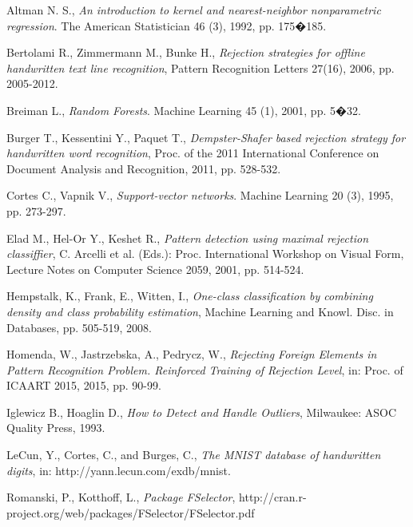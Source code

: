 \documentclass{llncs}
\begin{document}
\begin{thebibliography}{1}

Altman N. S., \emph{An introduction to kernel and nearest-neighbor nonparametric regression}. The American Statistician 46 (3), 1992, pp. 175�185.

Bertolami R., Zimmermann M., Bunke H., \emph{Rejection strategies for offline handwritten text line recognition}, Pattern Recognition Letters 27(16), 2006, pp. 2005-2012.

Breiman L., \emph{Random Forests}. Machine Learning 45 (1), 2001, pp. 5�32. 

Burger T., Kessentini Y., Paquet T., \emph{Dempster-Shafer based rejection strategy for handwritten word recognition}, Proc. of the 2011 International Conference on Document Analysis and Recognition, 2011, pp. 528-532.

Cortes C., Vapnik V., \emph{Support-vector networks}. Machine Learning 20 (3), 1995, pp. 273-297.
 
Elad M., Hel-Or Y., Keshet R., \emph{Pattern detection using maximal rejection classiffier}, C. Arcelli et al. (Eds.): Proc. International Workshop on Visual Form, Lecture Notes on Computer Science 2059, 2001, pp. 514-524.
 
Hempstalk, K., Frank, E., Witten, I., \emph{One-class classification by combining density and class probability estimation}, Machine Learning and Knowl. Disc. in Databases, pp. 505-519, 2008.

Homenda, W., Jastrzebska, A., Pedrycz, W., \emph{Rejecting Foreign Elements in Pattern Recognition Problem. Reinforced Training of Rejection Level}, in: Proc. of ICAART 2015, 2015, pp. 90-99.

Iglewicz B., Hoaglin D., \emph{How to Detect and Handle Outliers},  Milwaukee: ASOC Quality Press, 1993.

LeCun, Y., Cortes, C., and Burges, C., \emph{The MNIST database of handwritten digits}, in: http://yann.lecun.com/exdb/mnist.

Romanski, P., Kotthoff, L., \emph{Package FSelector}, http://cran.r-project.org/web/packages/FSelector/FSelector.pdf


\end{thebibliography}
\end{document}
